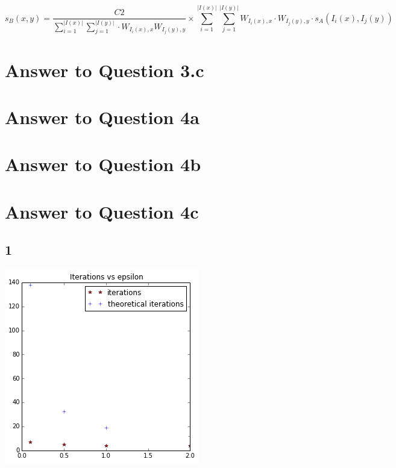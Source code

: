 \documentclass[11pt]{article}
\begin{document}
{\begin{small}
\begin{equation}
s_B (x, y) = \dfrac{C2}{\sum_{i=1}^{|I(x)|} \sum_{j=1}^{|I(y)|} \cdot W_{I_i(x), x} W_{I_j(y), y}} \times
\sum_{i=1}^{|I(x)|} \sum_{j=1}^{|I(y)|} W_{I_i(x), x} \cdot W_{I_j(y), y} \cdot s_A(I_i(x), I_j (y ))
\end{equation}
\end{small}


\pagebreak[4]
\section*{Answer to Question 3.c}


\pagebreak[4]
\section*{Answer to Question 4a}


\pagebreak[4]
\section*{Answer to Question 4b}

\pagebreak[4]
\section*{Answer to Question 4c}


\subsection*{1}
\includegraphics[scale=0.8]{q4c1}\\

\vspace{2cm}

}
\end{document}
